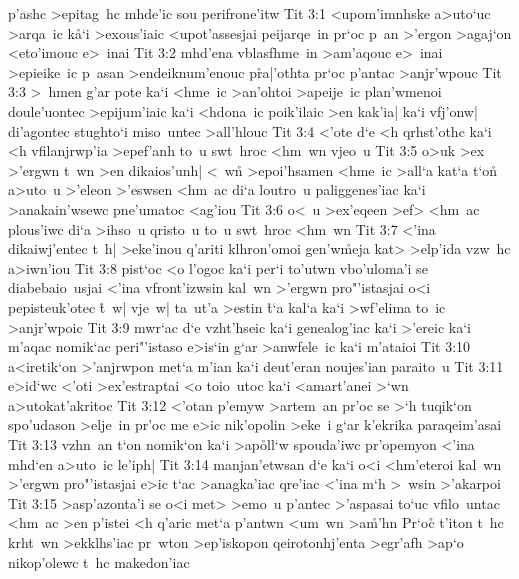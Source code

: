 p'ashc
>epitag~hc
mhde'ic
sou
perifrone'itw\bibvsend
\vs Tit 3:1
<upom'imnhske
a>uto`uc
>arqa~ic
k\r{a}`i
>exous'iaic
<upot'assesjai
peijarqe~in
pr`oc
p~an
>'ergon
>agaj`on
<eto'imouc
e>~inai\bibvsend
\vs Tit 3:2
mhd'ena
vblasfhme~in
>am'aqouc
e>~inai
>epieike~ic
p~asan
>endeiknum'enouc
p\r{r}a|\-'o\-th\-ta
pr`oc
p'antac
>anjr'wpouc\bibvsend
\vs Tit 3:3
>~hmen
g'ar
pote
ka`i
<hme~ic
>an'ohtoi
>apeije~ic
plan'wmenoi
doule'uontec
>epijum'iaic
ka`i
<hdona~ic
poik'ilaic
>en
kak'ia|
ka`i
vfj'onw|
di'agontec
stughto`i
miso~untec
>all'hlouc\bibvsend
\vs Tit 3:4
<'ote
d`e
<h
qrhst'othc
ka`i
<h
vfilanjrwp'ia
>epef'anh
to~u
swt~hroc
<hm~wn
vjeo~u\bibvsend
\vs Tit 3:5
o>uk
>ex
>'ergwn
t~wn
>en
dikaios'unh|
<~w\r{n}
>epoi'hsamen
<hme~ic
>all`a
kat`a
t`on\r{}
a>uto~u
>'eleon
>'eswsen
<hm~ac
di`a
loutro~u
paliggenes'iac
ka`i
>anakain'wsewc
pne'umatoc
<ag'iou\bibvsend
\vs Tit 3:6
o<~u
>ex'eqeen
>ef>
<hm~ac
plous'iwc
di`a
>ihso~u
qristo~u
to~u
swt~hroc
<hm~wn\bibvsend
\vs Tit 3:7
<'ina
dikaiwj'entec
t~h|
>eke'inou
q'ariti
klhron'omoi
gen'w\r{m}eja
kat>
>elp'ida
vzw~hc
a>iwn'iou\bibvsend
\vs Tit 3:8
pist`oc
<o
l'ogoc
ka`i
per`i
to'utwn
vbo'uloma'i
se
diabebaio~usjai
<'ina
vfront'izwsin
kal~wn
>'ergwn
pro"'istasjai
o<i
pepisteuk'otec
\r{t}~w|
vje~w|
ta~ut'a
>estin
\r{t}`a
kal`a
ka`i
>wf'elima
to~ic
>anjr'wpoic\bibvsend
\vs Tit 3:9
mwr`ac
d`e
vzht'hseic
ka`i
genealog'iac
ka`i
>'ereic
ka`i
m'aqac
nomik`ac
peri"'istaso
e>is`in
g`ar
>anwfele~ic
ka`i
m'ataioi\bibvsend
\vs Tit 3:10
a<iretik`on
>'anjrwpon
met`a
m'ian
ka`i
deut'eran
noujes'ian
paraito~u\bibvsend
\vs Tit 3:11
e>id`wc
<'oti
>ex'estraptai
<o
toio~utoc
ka`i
<amart'anei
>`wn
a>utokat'akritoc\bibvsend
\vs Tit 3:12
<'otan
p'emyw
>artem~an
pr'oc
se
>`h
tuqik`on
spo'udason
>elje~in
pr'oc
me
e>ic
nik'opolin
>eke~i
g`ar
k'ekrika
paraqeim'asai\bibvsend
\vs Tit 3:13
vzhn~an
t`on
nomik`on
ka`i
>ap\r{o}ll`w
spouda'iwc
pr'opemyon
<'ina
mhd`en
a>uto~ic
le'iph|\bibvsend
\vs Tit 3:14
manjan'etwsan
d`e
ka`i
o<i
<hm'eteroi
kal~wn
>'ergwn
pro"'istasjai
e>ic
t`ac
>anagka'iac
qre'iac
<'ina
m`h
>~wsin
>'akarpoi\bibvsend
\vs Tit 3:15
>asp'azonta'i
se
o<i
met>
>emo~u
p'antec
>'aspasai
to`uc
vfilo~untac
<hm~ac
>en
p'istei
<h
q'aric
met`a
p'antwn
<um~wn
>a\r{m}'hn\bibvsend
{}
Pr`oc\r{}
t'iton
t~hc
krht~wn
>ekklhs'iac
pr~wton
>ep'iskopon
qeirotonhj'enta
>egr'afh
>ap`o
nikop'olewc
t~hc
makedon'iac\bibvsend
